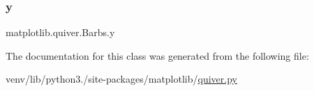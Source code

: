 \mbox{\label{classmatplotlib_1_1quiver_1_1Barbs_a3137a5e02dce7821d54630c32c83e783}} 
\subsubsection{\texorpdfstring{y}{y}}
{\footnotesize\ttfamily matplotlib.\+quiver.\+Barbs.\+y}



The documentation for this class was generated from the following file\+:\begin{DoxyCompactItemize}
\item 
venv/lib/python3./site-\/packages/matplotlib/\hyperlink{quiver_8py}{quiver.\+py}\end{DoxyCompactItemize}
